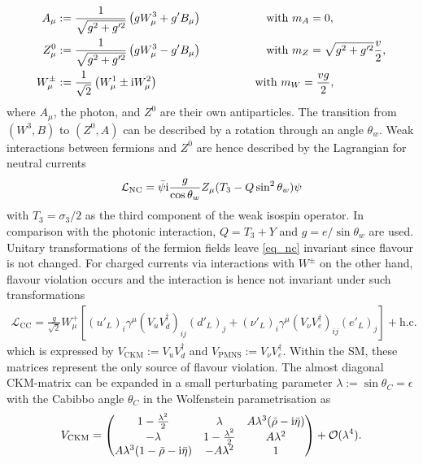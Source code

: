 \begin{align}
 A_\mu & := \frac{1}{\sqrt{g^2+g'^2}}\left(gW^3_\mu + g'B_\mu\right)\hspace{2cm}\text{with }m_A = 0,\\
 Z^0_\mu & := \frac{1}{\sqrt{g^2+g'^2}}\left(gW^3_\mu - g'B_\mu\right)\hspace{2cm}\text{with }m_Z = \sqrt{g^2+g'^2}\frac{v}{2},\\
 W^\pm_\mu &:= \frac{1}{\sqrt{2}}\left(W^1_\mu \pm \ti W^2_\mu\right)\hspace{3cm}\text{with }m_W=\frac{vg}{2},
\end{align}
where $A_\mu$, the photon, and $Z^0$ are their own antiparticles. The transition from $(W^3,B)$ to $(Z^0,A)$ can be described by a rotation 
through an angle $\theta_w$. Weak interactions
between fermions and $Z^0$ are hence described by the Lagrangian for neutral currents
\begin{align}
 \mathcal{L}_\text{NC} = \bar \psi \text{i}\frac{g}{\cos\theta_w}Z_\mu(T_3-Q\sin^2\theta_w) \psi
 \label{eq_nc}
\end{align}
with $T_3=\sigma_3/2$ as the third component of the weak isospin operator. In comparison with the photonic interaction, $Q=T_3+Y$ and 
$g=e/\sin\theta_w$ are used. Unitary transformations of the fermion fields leave \eqref{eq_nc} invariant since flavour is not changed. For 
charged currents via interactions with $W^\pm$ on the other hand, flavour violation occurs and the interaction is hence not invariant under
such transformations
\begin{align}
 \mathcal{L}_\text{CC} = \frac{g}{\sqrt{2}} W^+_\mu \left[(u'_L)_i \gamma^\mu(V_u V^\dagger_d)_{ij} (d'_L)_j + (\nu'_L)_i \gamma^\mu(V_\nu V^\dagger_e)_{ij} (e'_L)_j\right] + \text{h.c.}
 \label{eq_cc}
\end{align}
which is expressed by $V_\text{CKM}:=V_uV^\dagger_d$ and $V_\text{PMNS}:=V_\nu V^\dagger_e$. Within the SM, these matrices represent the only
source of flavour violation. The almost diagonal CKM-matrix can be expanded in a small perturbating parameter $\lambda:=\sin\theta_C=\epsilon$ with
the Cabibbo angle $\theta_C$ in the Wolfenstein parametrisation as
\begin{align}
 V_\text{CKM} = \begin{pmatrix}
                 1-\frac{\lambda^2}{2} & \lambda & A\lambda^3(\bar\rho -\text{i} \bar\eta)\\
                 -\lambda & 1-\frac{\lambda^2}{2} & A\lambda^2\\
                 A\lambda^3(1-\bar\rho -\text{i} \bar\eta) & -A\lambda^2 & 1
                \end{pmatrix} + \mathcal{O}(\lambda^4).
            \label{eq_ckm}
\end{align}
